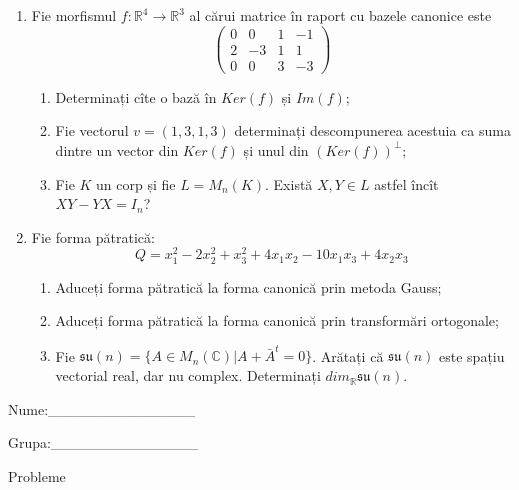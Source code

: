 \documentclass{article}
\begin{document}
\begin{enumerate}
 \item Fie morfismul $f:\mathbb{R}^4 \to \mathbb{R}^3$ al cărui matrice în raport cu bazele canonice este
$$\begin{pmatrix}
0&0&1&-1\\
2&-3&1&1\\
0&0&3&-3
\end{pmatrix}$$

\begin{enumerate}
\item Determinați cîte o bază în $Ker(f)$ și $Im(f)$;
\item Fie vectorul $v=(1,3,1,3)$ determinați descompunerea acestuia ca suma dintre un vector din $Ker(f)$ și unul din $(Ker(f))^\perp$;
\item Fie $K$ un corp și fie $L=M_n(K)$. Există $X,Y \in L$ astfel încît $XY-YX=I_n$?  
\end{enumerate}
\item Fie forma pătratică:
$$Q= x_1^2-2x_2^2+x_3^2+4x_1x_2-10x_1x_3+4x_2x_3$$

\begin{enumerate}
\item Aduceți forma pătratică la forma canonică prin metoda Gauss;
\item Aduceți forma pătratică la forma canonică prin transformări ortogonale;
\item Fie $\mathfrak{su}(n)=\{ A \in M_n(\mathbb{C}) | A+\bar{A}^t=0\}$. Arătați că $\mathfrak{su}(n)$ este spațiu vectorial real, dar nu complex.
Determinați $dim_{\mathbb{R}}\mathfrak{su}(n)$.
\end{enumerate}
\end{enumerate}
\newpage
\begin{flushright}
Nume:\_\_\_\_\_\_\_\_\_\_\_\_\_\_
 
 
Grupa:\_\_\_\_\_\_\_\_\_\_\_\_\_\_
\end{flushright}
\begin{center}
\vspace{2cm}
{\Large Probleme}
\vspace{2cm}
\end{center}
\end{document}

